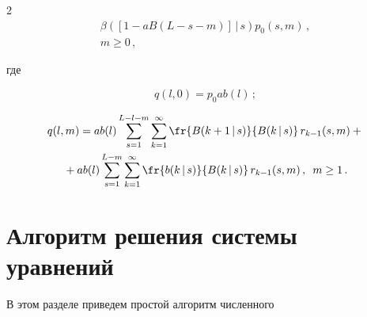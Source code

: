 \begin{multicols}{2}
\begin{multline}
\beta([1 - a B(L-s-m)]\,|\,s)


p_{0}(s,m)\,,


\\


m \ge 0\,,


\label{6.2*.15}


\end{multline}


где


\begin{equation}


\label{6.2*.16}


q(l,0) = p_0 a b(l) \,;


\end{equation}





\vspace*{-9pt}





\noindent


\begin{multline}


q(l,m) = a b(l)


\sum\limits_{s=1}^{L-l-m}


\sum\limits_{k=1}^\infty


\fr{B(k+1\,|\,s)}{ B(k\,|\,s)}\,


r_{k-1}(s,m)  +{}\\


{}+ a b(l) \sum\limits_{s=1}^{L-m}


\sum\limits_{k=1}^\infty


\fr{b(k\,|\,s)}{ B(k\,|\,s)}\,


r_{k-1}(s,m)\,,


\enskip m \ge 1\,.


\label{6.2*.17}


\end{multline}







\section{Алгоритм решения системы уравнений}





В этом разделе приведем простой алгоритм чис\-лен\-но\-го



\end{multicols}
